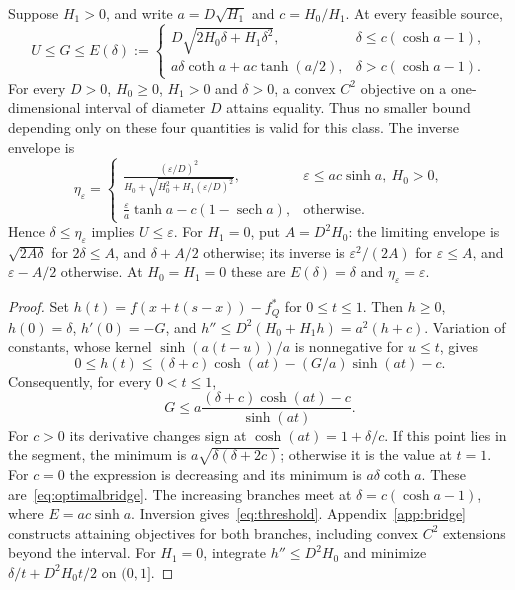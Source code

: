 \begin{theorem}\label{lem:bridge}
Suppose $H_1>0$, and write $a=D\sqrt{H_1}$ and $c=H_0/H_1$.
At every feasible source,
\begin{equation}\label{eq:optimalbridge}
 U\le G\le E(\delta):=
 \begin{cases}
 D\sqrt{2H_0\delta+H_1\delta^2},&\delta\le c(\cosh a-1),\\
 a\delta\coth a+ac\tanh(a/2),&\delta>c(\cosh a-1).
 \end{cases}
\end{equation}
For every $D>0$, $H_0\ge0$, $H_1>0$ and $\delta>0$, a convex
$C^2$ objective on a one-dimensional interval of diameter $D$
attains equality. Thus no smaller bound depending only on these
four quantities is valid for this class.
The inverse envelope is
\begin{equation}\label{eq:threshold}
 \eta_\varepsilon=
 \begin{cases}
 \displaystyle\frac{(\varepsilon/D)^2}
 {H_0+\sqrt{H_0^2+H_1(\varepsilon/D)^2}},
       &\varepsilon\le ac\sinh a,\ H_0>0,\\[6pt]
 \displaystyle\frac{\varepsilon}{a}\tanh a-c(1-\operatorname{sech}a),
       &\text{otherwise}.
 \end{cases}
\end{equation}
Hence $\delta\le\eta_\varepsilon$ implies $U\le\varepsilon$.
For $H_1=0$, put $A=D^2H_0$: the limiting envelope is
$\sqrt{2A\delta}$ for $2\delta\le A$, and $\delta+A/2$ otherwise;
its inverse is $\varepsilon^2/(2A)$ for $\varepsilon\le A$,
and $\varepsilon-A/2$ otherwise. At $H_0=H_1=0$ these are
$E(\delta)=\delta$ and $\eta_\varepsilon=\varepsilon$.
\end{theorem}
\begin{proof}
Set $h(t)=f(x+t(s-x))-f_Q^*$ for $0\le t\le1$.
Then $h\ge0$, $h(0)=\delta$, $h'(0)=-G$, and
$h''\le D^2(H_0+H_1h)=a^2(h+c)$.
Variation of constants, whose kernel $\sinh(a(t-u))/a$ is
nonnegative for $u\le t$, gives
\[
 0\le h(t)\le(\delta+c)\cosh(at)-(G/a)\sinh(at)-c.
\]
Consequently, for every $0<t\le1$,
\[
 G\le a\frac{(\delta+c)\cosh(at)-c}{\sinh(at)}.
\]
For $c>0$ its derivative changes sign at
$\cosh(at)=1+\delta/c$. If this point lies in the segment,
the minimum is $a\sqrt{\delta(\delta+2c)}$; otherwise it is
the value at $t=1$. For $c=0$ the expression is decreasing
and its minimum is $a\delta\coth a$. These are~\eqref{eq:optimalbridge}.
The increasing branches meet at $\delta=c(\cosh a-1)$, where
$E=ac\sinh a$. Inversion gives~\eqref{eq:threshold}.
Appendix~\ref{app:bridge} constructs attaining objectives for both
branches, including convex $C^2$ extensions beyond the interval.
For $H_1=0$, integrate $h''\le D^2H_0$ and minimize
$\delta/t+D^2H_0t/2$ on $(0,1]$.
\end{proof}

